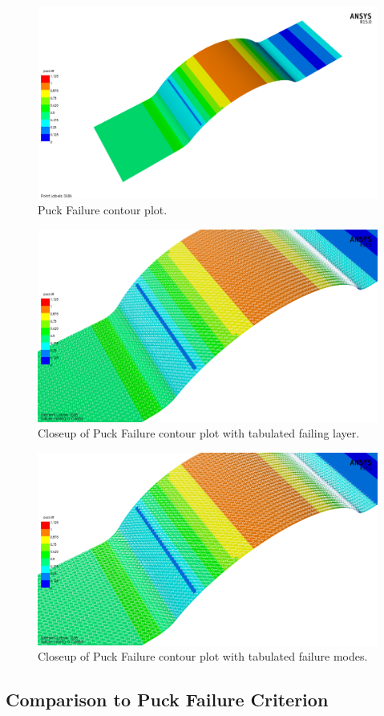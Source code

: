 
\begin{figure}[htp]
\centering
\includegraphics[width=1\textwidth]{./figures/fea/fea-acp-pfailure-notext}
\caption{Puck Failure contour plot.}
\label{fig:fea-acp-pfailure-notext}
\end{figure}

\begin{figure}[htp]
\centering
\includegraphics[width=1\textwidth]{./figures/fea/fea-acp-pfailure-layer-closeup}
\caption{Closeup of Puck Failure contour plot with tabulated failing layer.}
\label{fig:fea-acp-pfailure-layer-closeup}
\end{figure}

\begin{figure}[htp]
\centering
\includegraphics[width=1\textwidth]{./figures/fea/fea-acp-pfailure-mode-closeup}
\caption{Closeup of Puck Failure contour plot with tabulated failure modes.}
\label{fig:fea-acp-pfailure-mode-closeup}
\end{figure}

\clearpage

\subsection{Comparison to Puck Failure Criterion}

\clearpage

